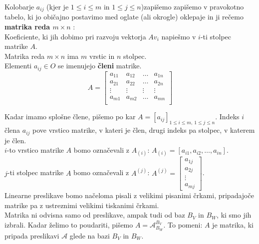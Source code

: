 \documentclass[a4paper,12pt]{article}
\begin{document}
Kolobarje $a_{ij}$ (kjer je $1 \leq i \leq m$ in $1 \leq j \leq n$)zapišemo zapišemo v pravokotno tabelo, ki jo običajno postavimo med oglate (ali okrogle) oklepaje in ji rečemo \textbf{matrika reda $m\times n$ }:\\

Koeficiente, ki jih dobimo pri razvoju vektorja $Av_i$ napiešmo v $i$-ti stolpec matrike $A$. \\

Matrika reda $m\times n$ ima $m$ vrstic in $n$ stolpec. \\

Elementi $a_{ij}\in O$ se imenujejo \textbf{členi} matrike. \\

$$A=
\begin{bmatrix}
	a_{11} & a_{12} & \ldots & a_{1n} \\
	a_{21} & a_{22} & \ldots & a_{2n} \\
	\vdots & \vdots & \vdots & \vdots \\
	a_{m1} & a_{m2} & \ldots & a_{mn} \\
\end{bmatrix}
$$

\newpage 

Kadar imamo splošne člene, pišemo po kar $A=[a_{ij}]_{1 \leq i \leq m,~ 1\leq j \leq n}$. Indeks $i$ člena $a_{ij}$ pove vrstico matrike, v kateri je člen, drugi indeks pa stolpec, v katerem je člen. \\

$i$-to vrstico matrike $A$ bomo označevali z $A_{(i)}$: $A_{(i)}=[a_{i1},a_{i2},\ldots,a_{in}]$.\\

$j$-ti stolpec matrike $A$ bomo označevali z $A^{(j)}$: $A^{(j)}=\begin{bmatrix} a_{1j} \\ a_{2j} \\ \vdots \\ a_{mj} \end{bmatrix}$.\\
	
Linearne preslikave bomo načeloma pisali z velikimi pisanimi črkami, pripadajoče matrike pa z ustreznimi velikimi tiskanimi črkami. \\

Matrika ni odvisna samo od preslikave, ampak tudi od baz $B_V$ in $B_W$, ki smo jih izbrali. Kadar želimo to poudariti, pišemo $A=\mathcal{A}_{B_W}^{B_V}$. To pomeni: $A$ je matrika, ki pripada preslikavi $\mathcal{A}$ glede na bazi $B_V$ in $B_W$. \\
\end{document}
